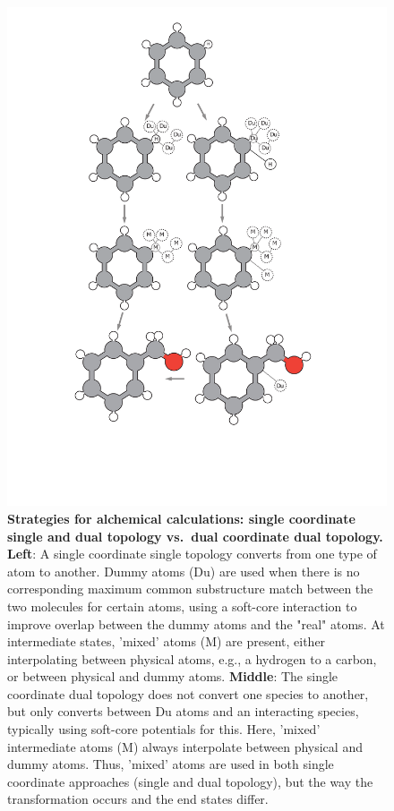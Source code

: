 \documentclass[9pt,bestpractices]{livecoms}
\begin{document}
\begin{figure}
    \includegraphics[width=0.95\columnwidth]{figures/fig3_topol/Figure.pdf}
    \caption{\textbf{Strategies for alchemical calculations: single coordinate single and dual topology vs.\ dual coordinate dual topology.} \textbf{Left}: A single coordinate single topology converts from one type of atom to another. Dummy atoms (Du) are used when there is no corresponding maximum common substructure match between the two molecules for certain atoms, using a soft-core interaction to improve overlap between the dummy atoms and the "real" atoms. At intermediate states, 'mixed' atoms (M) are present, either interpolating between physical atoms, e.g., a hydrogen to a carbon, or between physical and dummy atoms.  \textbf{Middle}: The single coordinate dual topology does not convert one species to another, but only converts between Du atoms and an interacting species, typically using soft-core potentials for this. Here, 'mixed' intermediate atoms (M) always interpolate between physical and dummy atoms. Thus, 'mixed' atoms are used in both single coordinate approaches (single and dual topology), but the way the transformation occurs and the end states differ.
}
\end{figure}
\end{document}
